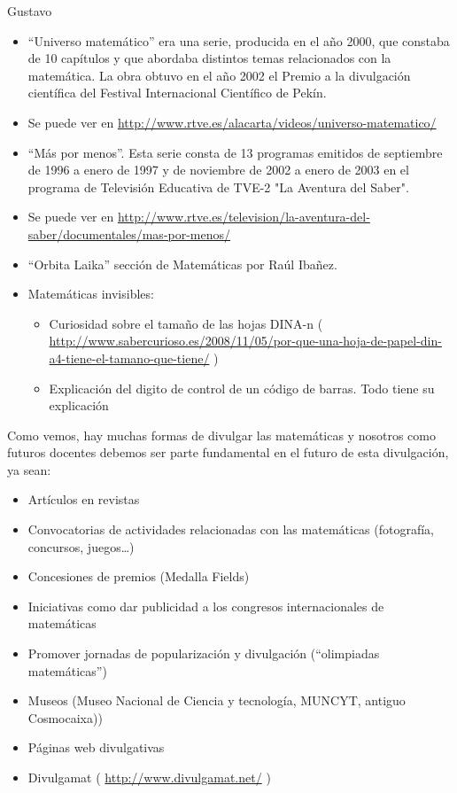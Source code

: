 \begin{opin}{\guscolor}{Gustavo}
\begin{itemize}
\item “Universo matemático” era una serie, producida en el año 2000, que constaba de 10 capítulos y que abordaba distintos temas relacionados con la matemática. La obra obtuvo en el año 2002 el Premio a la divulgación científica del Festival Internacional Científico de Pekín. 
\item Se puede ver en 
\href{http://www.rtve.es/alacarta/videos/universo-matematico/} {http://www.rtve.es/alacarta/videos/universo-matematico/} 
\item “Más por menos”. Esta serie consta de 13 programas emitidos de septiembre de 1996 a enero de 1997 y de noviembre de 2002 a enero de 2003 en el programa de Televisión Educativa de TVE-2 "La Aventura del Saber".
\item Se puede ver en 
\href{http://www.rtve.es/television/la-aventura-del-saber/documentales/mas-por-menos/} {http://www.rtve.es/television/la-aventura-del-saber/documentales/mas-por-menos/} 
\item “Orbita Laika” sección de Matemáticas por Raúl Ibañez.
\item Matemáticas invisibles:
\begin{itemize}
\item Curiosidad sobre el tamaño de las hojas DINA-n (
\href{http://www.sabercurioso.es/2008/11/05/por-que-una-hoja-de-papel-din-a4-tiene-el-tamano-que-tiene/}{http://www.sabercurioso.es/2008/11/05/por-que-una-hoja-de-papel-din-a4-tiene-el-tamano-que-tiene/}
)
\item Explicación del digito de control de un código de barras. Todo tiene su explicación
\end{itemize}
\end{itemize}



Como vemos, hay muchas formas de divulgar las matemáticas y nosotros como futuros docentes debemos ser parte fundamental en el futuro de esta divulgación, ya sean:

\begin{itemize}
\item Artículos en revistas  
\item Convocatorias de actividades relacionadas con las matemáticas (fotografía, concursos, juegos…)
\item Concesiones de premios (Medalla Fields) 
\item Iniciativas como dar publicidad a los congresos internacionales de matemáticas 
\item Promover jornadas de popularización y divulgación  (“olimpiadas matemáticas”) 
\item Museos (Museo Nacional de Ciencia y tecnología, MUNCYT, antiguo Cosmocaixa)) 
\item Páginas web divulgativas
\item Divulgamat (
\href{http://www.divulgamat.net/}{http://www.divulgamat.net/}
)
\end{itemize}


\end{opin}
